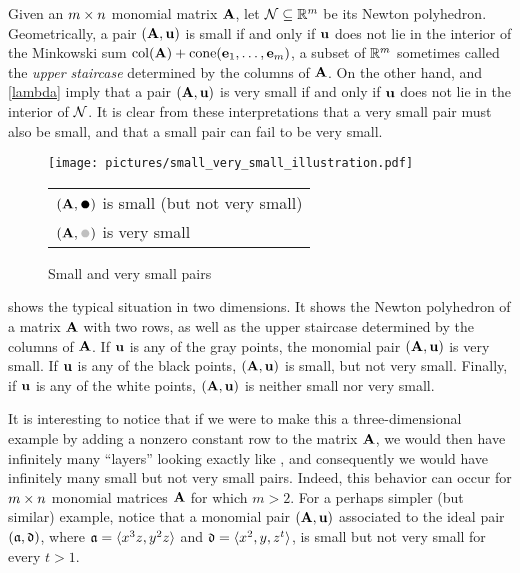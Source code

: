 \documentclass{amsart}
\begin{document}
\begin{remark}
\label{geometric small and very small: R}
Given an $m \times n$ monomial matrix $\mathbf{A}$, let $\mathcal{N} \subseteq \mathbb{R}^{m}$ be its Newton polyhedron.
Geometrically, a pair $(\mathbf{A}, \mathbf{u})$ is small if and only if $\mathbf{u}$ does not lie in the interior of the Minkowski sum $\operatorname{col}(\mathbf{A}) + \operatorname{cone}(\mathbf{e}_1,\ldots,\mathbf{e}_m)$, a subset of $\mathbb{R}^{m}$ sometimes called the \emph{upper staircase} determined by the columns of $\mathbf{A}$.
On the other hand,  and \ref{lambda} imply that a pair $(\mathbf{A}, \mathbf{u})$ is very small if and only if $\mathbf{u}$ does not lie in the interior of $\mathcal{N}$.
It is clear from these interpretations that a very small pair must also be small, and that a small pair can fail to be very small.
\end{remark}

\begin{example}
   \label{ex: small vs very small}
   \begin{figure}
      \centering
      \texttt{[image: pictures/small\_very\_small\_illustration.pdf]}\\[2mm]
      \begin{tabular}{l}
        $(\matA,\mathbin{\vcenter{\hbox{\scalebox{1.5}{$\bullet$}}}})$ is small (but not very small)\\[1mm]
        $(\matA,\textcolor{lightgray}{\mathbin{\vcenter{\hbox{\scalebox{1.5}{$\bullet$}}}}})$ is very small
      \end{tabular}                                                              
      \caption{Small and very small pairs}
      \label{fig: small vs very small}
   \end{figure}
    shows the typical situation in two dimensions.
   It shows the Newton polyhedron of a matrix $\mathbf{A}$ with two rows, as well as the upper staircase determined by the columns of $\mathbf{A}$.
   If $\mathbf{u}$ is any of the gray points, the monomial pair $(\mathbf{A},\mathbf{u})$ is very small.
   If $\mathbf{u}$ is any of the black points, $(\mathbf{A},\mathbf{u})$ is small, but not very small.
   Finally, if $\mathbf{u}$ is any of the white points, $(\mathbf{A},\mathbf{u})$ is neither small nor very small.

   It is interesting to notice that if we were to make this a three-dimensional example by adding a nonzero constant row to the matrix $\mathbf{A}$, we would then have infinitely many ``layers'' looking exactly like , and consequently we would have infinitely many small but not very small pairs.
   Indeed, this behavior can occur for $m \times n$ monomial matrices $\mathbf{A}$ for which $m > 2$.
   For a perhaps simpler (but similar) example, notice that a monomial pair $(\mathbf{A}, \mathbf{u})$ associated to the ideal pair $(\mathfrak{a}, \mathfrak{d})$, where $\mathfrak{a}= \langle x^3 z, y^2z \rangle$ and $\mathfrak{d} = \langle x^2, y, z^t \rangle$, is small but not very small for every $t > 1$.
\end{example}
\end{document}
